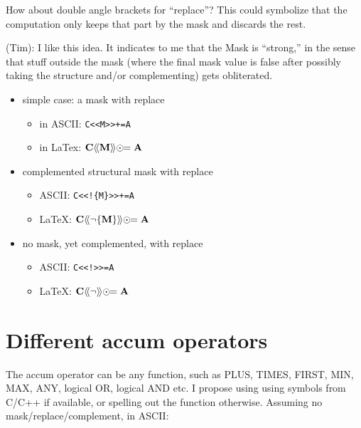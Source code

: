 \documentclass[11pt]{article}
\begin{document}
How about double angle brackets for ``replace''? This could symbolize that the computation only keeps that part by the mask and discards the rest.

(Tim):  I like this idea.  It indicates to me that the Mask is ``strong,''
in the sense that stuff outside the mask (where the final mask value is
false after possibly taking the structure and/or complementing)
gets obliterated.

\begin{itemize}

    \item simple case: a mask with replace
    
        \begin{itemize}
        \item[] in ASCII: \verb'C<<M>>+=A'
        \item[] in LaTex: $\bf C \langle\!\langle M \rangle\!\rangle \odot\!\!= A $
        \end{itemize}
    
    \item complemented structural mask with replace
    
        \begin{itemize}
        \item[] ASCII: \verb'C<<!{M}>>+=A'
        \item[] LaTeX: ${\bf C} \langle\!\langle \neg \{{\bf M}\}
        \rangle\!\rangle \odot\!\!= {\bf A}$
        \end{itemize}
    
    \item no mask, yet complemented, with replace
    
        \begin{itemize}
        \item[] ASCII: \verb'C<<!>>=A'
        \item[] LaTeX: ${\bf C} \langle\!\langle \neg \rangle\!\rangle \odot\!\!= {\bf A}$
        \end{itemize}

\end{itemize}

\section{Different accum operators}

The accum operator can be any function, such as PLUS, TIMES, FIRST, MIN, MAX,
ANY, logical OR, logical AND etc.  I propose using using symbols from C/C++ if 
available, or spelling out the function otherwise.
Assuming no mask/replace/complement, in ASCII:
\end{document}
